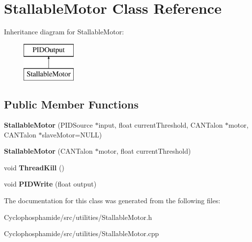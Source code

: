 \hypertarget{class_stallable_motor}{}\section{Stallable\+Motor Class Reference}
\label{class_stallable_motor}
Inheritance diagram for Stallable\+Motor\+:\begin{figure}[H]
\begin{center}
\leavevmode
\includegraphics[height=2.000000cm]{class_stallable_motor}
\end{center}
\end{figure}
\subsection*{Public Member Functions}
\begin{DoxyCompactItemize}
\item 
\hypertarget{class_stallable_motor_a5f9ae029cba417b1490e51e6a3498314}{}{\bfseries Stallable\+Motor} (P\+I\+D\+Source $\ast$input, float current\+Threshold, C\+A\+N\+Talon $\ast$motor, C\+A\+N\+Talon $\ast$slave\+Motor=N\+U\+L\+L)\label{class_stallable_motor_a5f9ae029cba417b1490e51e6a3498314}

\item 
\hypertarget{class_stallable_motor_a8e2d132e0a26ee8743a764fbc1c9700c}{}{\bfseries Stallable\+Motor} (C\+A\+N\+Talon $\ast$motor, float current\+Threshold)\label{class_stallable_motor_a8e2d132e0a26ee8743a764fbc1c9700c}

\item 
\hypertarget{class_stallable_motor_aaeab6d6a90993d56431ad2d4033e6eca}{}void {\bfseries Thread\+Kill} ()\label{class_stallable_motor_aaeab6d6a90993d56431ad2d4033e6eca}

\item 
\hypertarget{class_stallable_motor_a0931fab904d5651b2f822b2250552dde}{}void {\bfseries P\+I\+D\+Write} (float output)\label{class_stallable_motor_a0931fab904d5651b2f822b2250552dde}

\end{DoxyCompactItemize}


The documentation for this class was generated from the following files\+:\begin{DoxyCompactItemize}
\item 
Cyclophosphamide/src/utilities/Stallable\+Motor.\+h\item 
Cyclophosphamide/src/utilities/Stallable\+Motor.\+cpp\end{DoxyCompactItemize}
